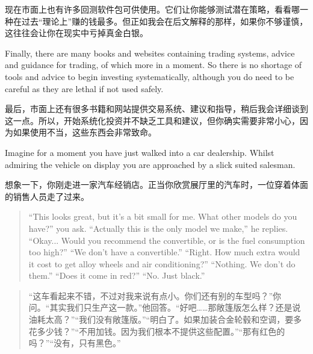 \begin{chineseblock}现在市面上也有许多回测软件包可供使用。它们让你能够测试潜在策略，看看哪一种在过去“理论上”赚的钱最多。但正如我会在后文解释的那样，如果你不够谨慎，这往往会让你在现实中亏掉真金白银。\end{chineseblock}

\bipairgap

\begin{englishblock} Finally, there are many books and websites containing trading systems, advice and guidance for trading, of which more in a moment. So there is no shortage of tools and advice to begin investing systematically, although you do need to be careful as they are lethal if not used safely. \end{englishblock}

\begin{chineseblock}最后，市面上还有很多书籍和网站提供交易系统、建议和指导，稍后我会详细谈到这一点。所以，开始系统化投资并不缺乏工具和建议，但你确实需要非常小心，因为如果使用不当，这些东西会非常致命。\end{chineseblock}


\begin{englishblock} Imagine for a moment you have just walked into a car dealership. Whilst admiring the vehicle on display you are approached by a slick suited salesman. \end{englishblock}

\begin{chineseblock}想象一下，你刚走进一家汽车经销店。正当你欣赏展厅里的汽车时，一位穿着体面的销售人员走了过来。\end{chineseblock}

\begin{quote}
\begingroup\color{\englishbodycolorname} ``This looks great, but it's a bit small for me. What other models do you have?'' you ask. ``Actually this is the only model we make,'' he replies. ``Okay... Would you recommend the convertible, or is the fuel consumption too high?'' ``We don't have a convertible.'' ``Right. How much extra would it cost to get alloy wheels and air conditioning?'' ``Nothing. We don't do them.'' ``Does it come in red?'' ``No. Just black.'' \endgroup
\end{quote}

\begin{quote}
\begingroup\color{\chinesebodycolorname}“这车看起来不错，不过对我来说有点小。你们还有别的车型吗？”你问。“其实我们只生产这一款。”他回答。“好吧……那敞篷版怎么样？还是说油耗太高？”“我们没有敞篷版。”“明白了。如果加装合金轮毂和空调，要多花多少钱？”“不用加钱。因为我们根本不提供这些配置。”“那有红色的吗？”“没有，只有黑色。”\endgroup
\end{quote}

